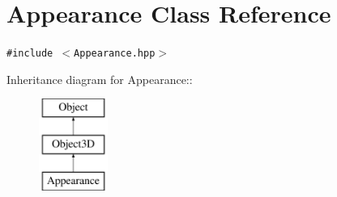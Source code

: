 \hypertarget{classm3g_1_1Appearance}{
\section{Appearance Class Reference}
\label{classm3g_1_1Appearance}
}
{\tt \#include $<$Appearance.hpp$>$}

Inheritance diagram for Appearance::\begin{figure}[H]
\begin{center}
\leavevmode
\includegraphics[height=3cm]{classm3g_1_1Appearance}
\end{center}
\end{figure}
